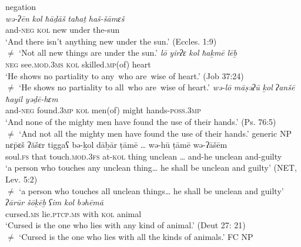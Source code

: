 \documentclass[output=paper]{langsci/langscibook}
\begin{document}
 \ea
 negation\label{ex:doron:37}\\
 \ea
 \gll \textit{wə-ʔēn}     \textit{kol}   \textit{ħāḏāš}  \textit{taħaṯ}  \textit{haš-šāmɛš}\\
      and-\textsc{neg}  \textsc{kol} new     under the-sun\\
 \glt `And there isn’t anything new under the sun.' (Eccles. 1:9)\\
     ${\neq}$  `Not all new things are under the sun.'
 \ex
 \gll \textit{lō}      \textit{yirʔɛ}                \textit{kol}   \textit{ħaḵmē}              \textit{lēḇ}  \\
      \textsc{neg}  see.\textsc{mod.3ms}   \textsc{kol} skilled\textsc{.mp}(of)  heart\\
 \glt `He shows no partiality to any~who are~wise of heart.' (Job 37:24)\\
     ${\neq}$  `He shows no partiality to all~who are~wise of heart.'
 \ex
 \gll \textit{wə-lō}       \textit{māṣəʔū}      \textit{ḵol}   \textit{ʔanšē}     \textit{ħayil}    \textit{yəḏē-hɛm}\\
      and-\textsc{neg} found.\textsc{3mp}  \textsc{kol} men(of) might  hands{}-\textsc{poss.3mp}\\
 \glt `And none of the mighty men have found the use of their hands.' (Ps. 76:5)\\
     ${\neq}$  `And not all the mighty men have found the use of their hands.'
 \z\pagebreak
\ex %
    generic NP\label{ex:doron:38}\\
    \ea
    \gll nɛ\={p}ɛš      ʔăšɛr tiggaʕ                bə-ḵol  dāḇār  ṭāmē …     wə-hū    ṭāmē      wə-ʔāšēm\\
         soul.\textsc{fs}   that   touch.\textsc{mod.3fs}  at-\textsc{kol} thing  unclean … and-he   unclean and-guilty\\
    \glt `a person who touches any unclean thing… he shall be unclean and guilty' (NET, Lev. 5:2)\\
        ${\neq}$   `a person who touches all unclean things… he shall be unclean and guilty'
    \ex
    \gll \textit{ʔārūr}          \textit{šōḵēḇ}          \textit{ʕim}   \textit{kol}   \textit{bəhēmā}\\
         cursed.\textsc{ms}  lie.\textsc{ptcp.ms}  with \textsc{kol} animal\\
    \glt `Cursed is the one who lies with any kind of animal.' (Deut 27: 21)\\
        ${\neq}$  `Cursed is the one who lies with all the kinds of animals.'
    \z
\ex %
    FC NP\label{ex:doron:39}\\
\end{document}
